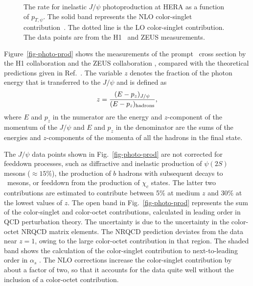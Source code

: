 \begin{figure}
\begin{center}
\caption{The rate for inelastic $J/\psi$ photoproduction at HERA
as a function of $p_{T,\psi}$. The solid band represents the NLO
color-singlet contribution~\cite{Kramer:1995nb,Kramer:2001hh}. The 
dotted line is the LO color-singlet contribution. The
data points are from the H1~\cite{Adloff:2002ex} and ZEUS
\cite{Chekanov:2002at} measurements.}
\label{fig-photo-prod-csm}
\end{center}
\end{figure}

Figure~\ref{fig-photo-prod} shows the measurements of the prompt
\jpsi\ cross section by the H1 collaboration \cite{Adloff:2002ex} 
and the ZEUS collaboration \cite{Chekanov:2002at}, compared with the
theoretical predictions given in Ref.~\cite{Kramer:2001hh}.
%
The variable $z$ denotes the fraction of the photon energy that is
transferred to the $J/\psi$ and is defined as
\begin{equation}
z={(E-p_z)_{J/\psi} \over (E-p_z)_{\rm hadrons}}, 
\label{eq:zdef}
\end{equation}
where $E$ and $p_z$ in the numerator are the
energy and $z$-component of the momentum of the $J/\psi$ and  
$E$ and $p_z$ in the denominator are the sums of the energies 
and $z$-components of the momenta of all the hadrons in the final state.

The $J/\psi$ data points shown in Fig.~\ref{fig-photo-prod} are not corrected
for feeddown processes, such as diffractive and inelastic production
of $\psi(2S)$ mesons ($\approx 15\% $), the production of $b$ hadrons
with subsequent decays to \jpsi\ mesons, or feeddown from the
production of $\chi_c$ states. The latter two contributions are
estimated to contribute between 5\% at medium $z$ and 30\% at the
lowest values of $z$.
%
The open band in Fig.~\ref{fig-photo-prod} represents the sum of the
color-singlet and color-octet contributions, calculated in leading
order in QCD perturbation theory.  The uncertainty is due to the
uncertainty in the color-octet NRQCD matrix elements. The NRQCD
prediction deviates from the data near $z=1$, owing to the large
color-octet contribution in that region.  The shaded band shows the
calculation of the color-singlet contribution to next-to-leading order
in $\alpha_s$
\cite{Kramer:1994zi,Kramer:1995nb}. The NLO corrections increase 
the color-singlet contribution by about a factor of two, so that it
accounts for the data quite well without the inclusion of a
color-octet contribution.
%

